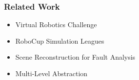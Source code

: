 \documentclass[]{beamer}
\begin{document}
\begin{frame}
  \frametitle{Related Work}
  \begin{multicols}{2}
    
    \begin{overlayarea}{0.52\textwidth}{.5\textheight}
      \begin{itemize}
      \item Virtual Robotics Challenge
        \pause
      \item RoboCup Simulation Leagues
        \pause
      \item Scene Reconstruction for Fault Analysis
        \pause
      \item Multi-Level Abstraction
      \end{itemize}
    \end{overlayarea}
  \end{multicols}
\end{frame}
\end{document}
